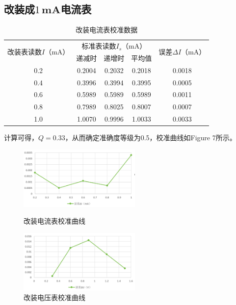\documentclass{article}
\begin{document}
\subsection{改装成$1\, \mathbf{mA}$电流表}
\begin{table}[h]
    \centering
    \renewcommand{\arraystretch}{1.2}
    \caption{改装电流表校准数据}
    \vspace{8pt}
    \label{table1}
    \begin{tabular}{cc|c|cc}
        \hline
        \multirow{2}{*}{改装表读数\(I\)（mA）} & \multicolumn{3}{c}{标准表读数\(I_s\)（mA）} & \multirow{2}{*}{误差\(\Delta I\)（mA） }\\
        \cline{2-4} 
         & 递减时 & 递增时 & 平均值 &  \\
         \hline
         0.2   & 0.2004 & 0.2032 & 0.2018 & 0.0018 \\ \hline
         0.4   & 0.3996 & 0.3994 & 0.3995 & 0.0005  \\ \hline
         0.6   & 0.5989 & 0.5989 & 0.5989 & 0.0011  \\ \hline
         0.8   & 0.7989 & 0.8025 & 0.8007 & 0.0007  \\ \hline
         1.0   & 1.0070 & 0.9996 & 1.0033 & 0.0033 \\ \hline  
        \hline
        \end{tabular}    
\end{table}
计算可得，$Q=0.33$，从而确定准确度等级为0.5，校准曲线如Figure 7所示。
\begin{figure}[H]
    \centering
    \begin{minipage}{0.45\textwidth} %
        \centering
        \includegraphics[width=6cm]{3.1.png} %
        \caption{改装电流表校准曲线}
    \end{minipage}\hfill
    \begin{minipage}{0.45\textwidth}
        \centering
        \includegraphics[width=6cm]{3.2.png} %
        \caption{改装电压表校准曲线}
    \end{minipage}
\end{figure}
\end{document}
